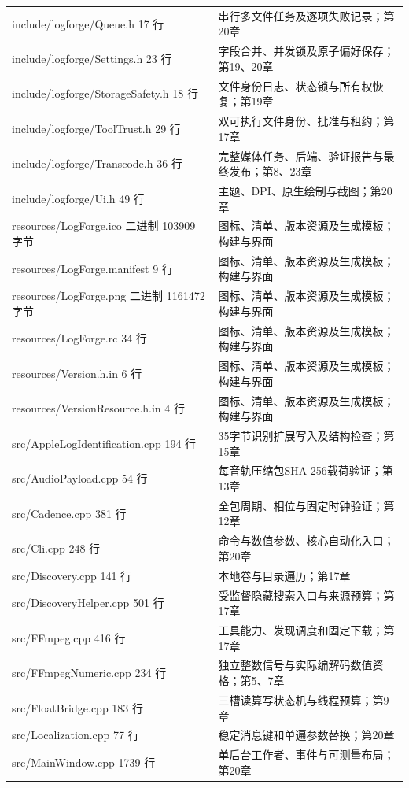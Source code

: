 \documentclass[UTF8,zihao=-4,openany]{ctexbook}
\begin{document}
\begin{longtable}{p{.43\linewidth}p{.47\linewidth}}
include/logforge/Queue.h
17 行 & 串行多文件任务及逐项失败记录；第20章\\
include/logforge/Settings.h
23 行 & 字段合并、并发锁及原子偏好保存；第19、20章\\
include/logforge/StorageSafety.h
18 行 & 文件身份日志、状态锁与所有权恢复；第19章\\
include/logforge/ToolTrust.h
29 行 & 双可执行文件身份、批准与租约；第17章\\
include/logforge/Transcode.h
36 行 & 完整媒体任务、后端、验证报告与最终发布；第8、23章\\
include/logforge/Ui.h
49 行 & 主题、DPI、原生绘制与截图；第20章\\
resources/LogForge.ico
二进制 103909 字节 & 图标、清单、版本资源及生成模板；构建与界面\\
resources/LogForge.manifest
9 行 & 图标、清单、版本资源及生成模板；构建与界面\\
resources/LogForge.png
二进制 1161472 字节 & 图标、清单、版本资源及生成模板；构建与界面\\
resources/LogForge.rc
34 行 & 图标、清单、版本资源及生成模板；构建与界面\\
resources/Version.h.in
6 行 & 图标、清单、版本资源及生成模板；构建与界面\\
resources/VersionResource.h.in
4 行 & 图标、清单、版本资源及生成模板；构建与界面\\
src/AppleLogIdentification.cpp
194 行 & 35字节识别扩展写入及结构检查；第15章\\
src/AudioPayload.cpp
54 行 & 每音轨压缩包SHA-256载荷验证；第13章\\
src/Cadence.cpp
381 行 & 全包周期、相位与固定时钟验证；第12章\\
src/Cli.cpp
248 行 & 命令与数值参数、核心自动化入口；第20章\\
src/Discovery.cpp
141 行 & 本地卷与目录遍历；第17章\\
src/DiscoveryHelper.cpp
501 行 & 受监督隐藏搜索入口与来源预算；第17章\\
src/FFmpeg.cpp
416 行 & 工具能力、发现调度和固定下载；第17章\\
src/FFmpegNumeric.cpp
234 行 & 独立整数信号与实际编解码数值资格；第5、7章\\
src/FloatBridge.cpp
183 行 & 三槽读算写状态机与线程预算；第9章\\
src/Localization.cpp
77 行 & 稳定消息键和单遍参数替换；第20章\\
src/MainWindow.cpp
1739 行 & 单后台工作者、事件与可测量布局；第20章\\

\end{longtable}
\end{document}

